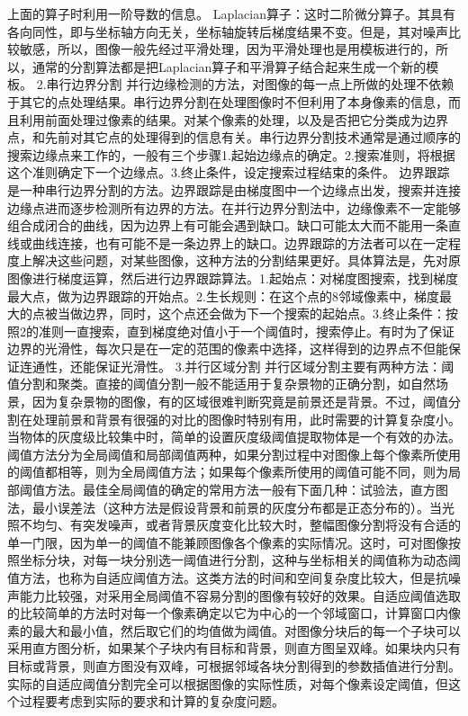 \documentclass[18pt, twoside, a4paper, dvipdfm]{book}
\begin{document}
上面的算子时利用一阶导数的信息。
Laplacian算子：这时二阶微分算子。其具有各向同性，即与坐标轴方向无关，坐标轴旋转后梯度结果不变。但是，其对噪声比较敏感，所以，图像一般先经过平滑处理，因为平滑处理也是用模板进行的，所以，通常的分割算法都是把Laplacian算子和平滑算子结合起来生成一个新的模板。
2.串行边界分割
并行边缘检测的方法，对图像的每一点上所做的处理不依赖于其它的点处理结果。串行边界分割在处理图像时不但利用了本身像素的信息，而且利用前面处理过像素的结果。对某个像素的处理，以及是否把它分类成为边界点，和先前对其它点的处理得到的信息有关。串行边界分割技术通常是通过顺序的搜索边缘点来工作的，一般有三个步骤1.起始边缘点的确定。2.搜索准则，将根据这个准则确定下一个边缘点。3.终止条件，设定搜索过程结束的条件。
边界跟踪是一种串行边界分割的方法。边界跟踪是由梯度图中一个边缘点出发，搜索并连接边缘点进而逐步检测所有边界的方法。在并行边界分割法中，边缘像素不一定能够组合成闭合的曲线，因为边界上有可能会遇到缺口。缺口可能太大而不能用一条直线或曲线连接，也有可能不是一条边界上的缺口。边界跟踪的方法者可以在一定程度上解决这些问题，对某些图像，这种方法的分割结果更好。具体算法是，先对原图像进行梯度运算，然后进行边界跟踪算法。1.起始点：对梯度图搜索，找到梯度最大点，做为边界跟踪的开始点。2.生长规则：在这个点的8邻域像素中，梯度最大的点被当做边界，同时，这个点还会做为下一个搜索的起始点。3.终止条件：按照2的准则一直搜索，直到梯度绝对值小于一个阈值时，搜索停止。有时为了保证边界的光滑性，每次只是在一定的范围的像素中选择，这样得到的边界点不但能保证连通性，还能保证光滑性。
3.并行区域分割
并行区域分割主要有两种方法：阈值分割和聚类。直接的阈值分割一般不能适用于复杂景物的正确分割，如自然场景，因为复杂景物的图像，有的区域很难判断究竟是前景还是背景。不过，阈值分割在处理前景和背景有很强的对比的图像时特别有用，此时需要的计算复杂度小。当物体的灰度级比较集中时，简单的设置灰度级阈值提取物体是一个有效的办法。
阈值方法分为全局阈值和局部阈值两种，如果分割过程中对图像上每个像素所使用的阈值都相等，则为全局阈值方法；如果每个像素所使用的阈值可能不同，则为局部阈值方法。最佳全局阈值的确定的常用方法一般有下面几种：试验法，直方图法，最小误差法（这种方法是假设背景和前景的灰度分布都是正态分布的）。当光照不均匀、有突发噪声，或者背景灰度变化比较大时，整幅图像分割将没有合适的单一门限，因为单一的阈值不能兼顾图像各个像素的实际情况。这时，可对图像按照坐标分块，对每一块分别选一阈值进行分割，这种与坐标相关的阈值称为动态阈值方法，也称为自适应阈值方法。这类方法的时间和空间复杂度比较大，但是抗噪声能力比较强，对采用全局阈值不容易分割的图像有较好的效果。自适应阈值选取的比较简单的方法时对每一个像素确定以它为中心的一个邻域窗口，计算窗口内像素的最大和最小值，然后取它们的均值做为阈值。对图像分块后的每一个子块可以采用直方图分析，如果某个子块内有目标和背景，则直方图呈双峰。如果块内只有目标或背景，则直方图没有双峰，可根据邻域各块分割得到的参数插值进行分割。实际的自适应阈值分割完全可以根据图像的实际性质，对每个像素设定阈值，但这个过程要考虑到实际的要求和计算的复杂度问题。
\end{document}

